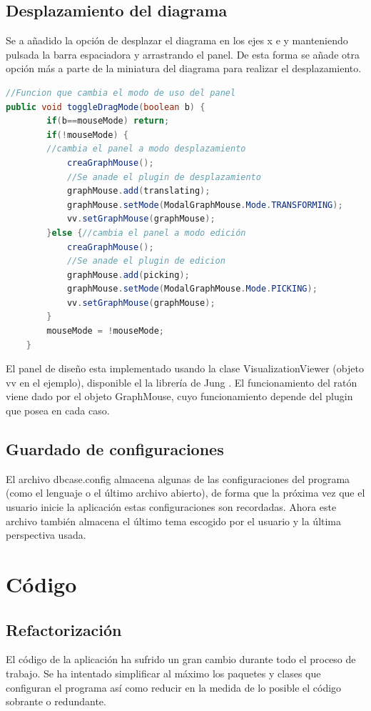 \subsection{Desplazamiento del diagrama}
Se a añadido la opción de desplazar el diagrama en los ejes x e y manteniendo pulsada la barra espaciadora y arrastrando el panel. De esta forma se añade otra opción más a parte de la miniatura del diagrama para realizar el desplazamiento.
\\

\begin{lstlisting}[xleftmargin = 2cm,language=java]
//Funcion que cambia el modo de uso del panel
public void toggleDragMode(boolean b) {
		if(b==mouseMode) return;
		if(!mouseMode) {
		//cambia el panel a modo desplazamiento
			creaGraphMouse();
			//Se anade el plugin de desplazamiento
			graphMouse.add(translating);
			graphMouse.setMode(ModalGraphMouse.Mode.TRANSFORMING);
			vv.setGraphMouse(graphMouse);
		}else {//cambia el panel a modo edición
			creaGraphMouse();
			//Se anade el plugin de edicion
			graphMouse.add(picking);
			graphMouse.setMode(ModalGraphMouse.Mode.PICKING);
			vv.setGraphMouse(graphMouse);
		}
		mouseMode = !mouseMode;
	}
\end{lstlisting}

El panel de diseño esta implementado usando la clase VisualizationViewer \cite{vv} (objeto vv en el ejemplo), disponible el la librería de Jung \cite{jung}. El funcionamiento del ratón viene dado por el objeto GraphMouse, cuyo funcionamiento depende del plugin que posea en cada caso.
\subsection{Guardado de configuraciones}
El archivo dbcase.config almacena algunas de las configuraciones del programa (como el lenguaje o el último archivo abierto), de forma que la próxima vez que el usuario inicie la aplicación estas configuraciones son recordadas. Ahora este archivo también almacena el último tema escogido por el usuario y la última perspectiva usada.

\section{Código}
\subsection{Refactorización}
El código de la aplicación ha sufrido un gran cambio durante todo el proceso de trabajo. Se ha intentado simplificar al máximo los paquetes y clases que configuran el programa así como reducir en la medida de lo posible el código sobrante o redundante.\\

